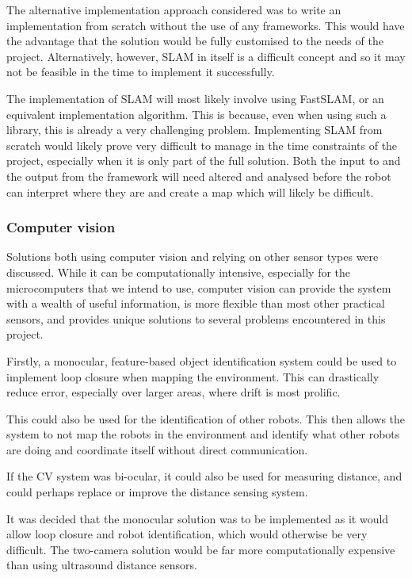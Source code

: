 The alternative implementation approach considered was to write an implementation
from scratch without the use of any frameworks. This would have the advantage that the solution would be fully customised to the needs of the project. Alternatively, however,
SLAM in itself is a difficult concept and so it may not be feasible in the time to
implement it successfully.

The implementation of SLAM will most likely involve using FastSLAM, or an equivalent
implementation algorithm. This is because, even when using such a library, this is already a very challenging
problem. Implementing SLAM from scratch would likely prove very difficult to manage in
the time constraints of the project, especially when it is only part of the full
solution. Both the input to and the output from the framework will need altered and
analysed before the robot can interpret where they are and create a map which will likely be difficult.

\subsubsection{Computer vision}

Solutions both using computer vision and relying on other sensor types were discussed.
While it can be computationally intensive, especially for the microcomputers that we
intend to use, computer vision can provide the system with a wealth of useful information,
is more flexible than most other practical sensors, and provides unique solutions to
several problems encountered in this project.

Firstly, a monocular, feature-based object identification system could be used to
implement loop closure when mapping the environment. This can drastically reduce error,
especially over larger areas, where drift is most prolific.

This could also be used for the identification of other robots. This then allows the
system to not map the robots in the environment and identify what other robots are
doing and coordinate itself without direct communication.

If the CV system was bi-ocular, it could also be used for measuring distance, and
could perhaps replace or improve the distance sensing system.

It was decided that the monocular solution was to be implemented as it would allow
loop closure and robot identification, which would otherwise be very difficult. The
two-camera solution would be far more computationally expensive than using
ultrasound distance sensors.

